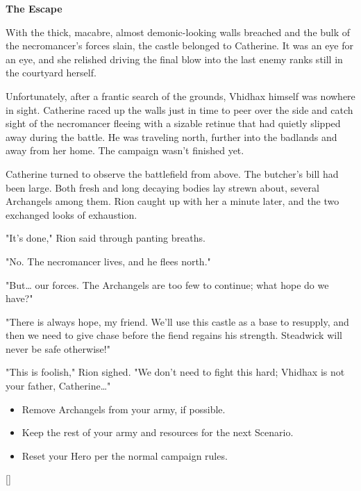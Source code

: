 \begin{multicols*}{2}
\textbf{The Escape}

With the thick, macabre, almost demonic-looking walls breached and the bulk of the necromancer's forces slain, the castle belonged to Catherine. It was an eye for an eye, and she relished driving the final blow into the last enemy ranks still in the courtyard herself. 

Unfortunately, after a frantic search of the grounds, Vhidhax himself was nowhere in sight. Catherine raced up the walls just in time to peer over the side and catch sight of the necromancer fleeing with a sizable retinue that had quietly slipped away during the battle. He was traveling north, further into the badlands and away from her home. The campaign wasn't finished yet.

Catherine turned to observe the battlefield from above. The butcher's bill had been large. Both fresh and long decaying bodies lay strewn about, several Archangels among them. Rion caught up with her a minute later, and the two exchanged looks of exhaustion.

"It's done," Rion said through panting breaths.

"No. The necromancer lives, and he flees north."

"But… our forces. The Archangels are too few to continue; what hope do we have?"

"There is always hope, my friend. We'll use this castle as a base to resupply, and then we need to give chase before the fiend regains his strength. Steadwick will never be safe otherwise!"

"This is foolish," Rion sighed. "We don't need to fight this hard; Vhidhax is not your father, Catherine…"

\begin{itemize}
  \item \textcolor{darkcandyapplered}{Remove Archangels from your army, if possible.}
  \item \textcolor{darkcandyapplered}{Keep the rest of your army and resources for the next Scenario.}
  \item \textcolor{darkcandyapplered}{Reset your Hero per the normal campaign rules.}
\end{itemize}

\vspace{2em}
\begin{center}
  \raisebox{0pt}[\dimexpr{}\baselineskip\relax]{}
\end{center}

\end{multicols*}



